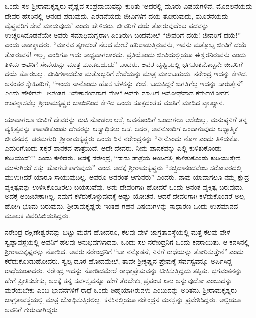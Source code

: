 ಒಂದು ಸಲ ಶ‍್ರೀರಾಮಕೃಷ್ಣರು ವೈಷ್ಣವ ಸಂಪ್ರದಾಯವನ್ನು ಕುರಿತು ‘ಅದರಲ್ಲಿ ಮೂರು ವಿಷಯಗಳಿವೆ; ಮೊದಲನೆಯದು ದೇವರ ಹೆಸರಿನಲ್ಲಿ ಆನಂದ ಪಡುವುದು, ಎರಡನೆಯದು ಜೀವಿಗಳಿಗೆ ದಯೆ ತೋರುವುದು, ಮೂರನೆಯದು ವೈಷ್ಣವರಿಗೆ ಸೇವೆ ಮಾಡುವುದು’ ಎಂದು ಹೇಳಿದರು. ಜೀವರಿಗೆ ದಯೆ ತೋರುವುದೆಂಬ ಪದವನ್ನು ಉಚ್ಚರಿಸಿದೊಡನೆಯೇ ಅವರು ಸಮಾಧಿಮಗ್ನರಾಗಿ ಹಿಂತಿರುಗಿ ಬಂದಮೇಲೆ “ಜೀವರಿಗೆ ದಯೆ! ಜೀವರಿಗೆ ದಯೆ!” ಎಂದು ಅವಾಕ್ಕಾದರು. “ಮಾನವ ತೃಣದಂತೆ ನೆಲದ ಮೇಲೆ ಹರಿದಾಡುತ್ತಿರುವನು, ಇವನು ಮತ್ತೊಬ್ಬ ಜೀವಿಗೆ ದಯೆ ತೋರುವನೆ! ಇಲ್ಲ, ಎಂದಿಗೂ ಇದು ಸಾಧ್ಯವಾಗಲಾರದು. ಪ್ರತಿಯೊಂದು ಜೀವಿಯಲ್ಲಿಯೂ ಈಶ್ವರನಿರುವನು ಎಂದು ತಿಳಿದು ಅವನಿಗೆ ಸೇವೆಯನ್ನು ಮಾತ್ರ ಮಾಡಬಹುದು” ಎಂದರು. ಅವರ ದೃಷ್ಟಿಯಲ್ಲಿ ಭಗವಂತನೊಬ್ಬನೇ ಜೀವರಿಗೆ ದಯೆ ತೋರಬಲ್ಲ. ಜೀವಿಗಳಾದರೋ ಮತ್ತೊಬ್ಬರಿಗೆ ಸೇವೆಯನ್ನು ಮಾತ್ರ ಮಾಡಬಹುದು. ನರೇಂದ್ರ ಇದನ್ನು ಕೇಳಿದ. ಅನಂತರ ಸ್ನೇಹಿತರಿಗೆ, “ಇಂದು ನಾನೊಂದು ಹೊಸ ಬೆಳಕನ್ನು ಕಂಡೆ. ಬದುಕಿದ್ದರೆ ಜಗತ್ತಿಗೆಲ್ಲ ಇದನ್ನು ಸಾರುತ್ತೇನೆ” ಎಂದು ಹೇಳಿದನು. ಅನಂತರ ವಿವೇಕಾನಂದರಾದ ಮೇಲೆ ಅವರು ಮಾಡಿದ ಅಮೋಘವಾದ ಕರ್ಮಯೋಗದ ಉಪನ್ಯಾಸವೆಲ್ಲ ಶ‍್ರೀರಾಮಕೃಷ್ಣರ ಬಾಯಿನಿಂದ ಕೇಳಿದ ಒಂದು ಸೂತ್ರದಂತಹ ಮಾತಿಗೆ ಮಾಡಿದ ವ್ಯಾಖ್ಯಾನ.

ಯಾವಾಗಲೂ ಜೀವಿಗೆ ದೇವರನ್ನು ರುಚಿ ನೋಡಲು ಆಸೆ, ಅವನೊಂದಿಗೆ ಒಂದಾಗಲು ಆಸೆಯಿಲ್ಲ. ಮನುಷ್ಯನಿಗೆ ತನ್ನ ವ್ಯಕ್ತಿತ್ವವನ್ನು ಕಾಪಾಡಿಕೊಂಡು ದೇವರನ್ನು ಆಸ್ವಾಧಿಸಲು ಆಸೆ. ಆದರೆ, ಅವನೊಂದಿಗೆ ಒಂದಾಗುವುದು ಆಧ್ಯಾತ್ಮಿಕ ಜೀವನದಲ್ಲಿ ಚರಮಗುರಿ. ಶ‍್ರೀರಾಮಕೃಷ್ಣರು ಒಂದು ದಿನ ನರೇಂದ್ರನನ್ನು “ನೀನೊಂದು ನೊಣ ಎಂದು ತಿಳಿದುಕೊ. ಎದುರಿಗೊಂದು ಸಕ್ಕರೆ ಪಾನಕದ ಪಾತ್ರೆಯಿದೆ. ಅದೇ ದೇವರು. ನೀನು ಪಾನಕವನ್ನು ಎಲ್ಲಿ ಕುಳಿತುಕೊಂಡು ಕುಡಿಯುವೆ?” ಎಂದು ಕೇಳಿದರು. ಅದಕ್ಕೆ ನರೇಂದ್ರ, “ನಾನು ಪಾತ್ರೆಯ ಅಂಚಿನಲ್ಲಿ ಕುಳಿತುಕೊಂಡು ಕುಡಿಯುತ್ತೇನೆ. ಮುಳುಗಿದರೆ ಸತ್ತು ಹೋಗಬೇಕಾಗುವುದು” ಎಂದ. ಅದಕ್ಕೆ ಶ‍್ರೀರಾಮಕೃಷ್ಣರು “ಸಚ್ಚಿದಾನಂದವೆಂಬ ಸರೋವರದಲ್ಲಿ ಮುಳುಗಿದರೆ ಯಾರೂ ಸಾಯುವುದಿಲ್ಲ. ಅವರೂ ಅದರಂತೆ ಆಗುವರು” ಎಂದರು. ನಾವು ಯಾವಾಗಲೂ ನಮ್ಮ ಕ್ಷುದ್ರ ವ್ಯಕ್ತಿತ್ವವನ್ನು ಉಳಿಸಿಕೊಂಡಿರಲು ಬಯಸುವೆವು. ಅದು ದೇವರಿಗಾಗಿ ಹೋದರೆ ಒಂದು ಅನಂತ ವ್ಯಕ್ತಿತ್ವ ಬರುವುದು. ಅದಕ್ಕೆ ಅಂಜಬೇಕಾಗಿಲ್ಲ. ನಮಗೆ ಕಳೆದುಕೊಳ್ಳುವುದಕ್ಕೆ ಅಷ್ಟು ಯೋಚನೆ. ಆದರೆ ದೇವರಿಗಾಗಿ ಕಳೆದುಕೊಂಡರೆ ಅಲ್ಪ ಹೋಗಿ ಭೂಮ ಬರುವುದು. ಶ‍್ರೀರಾಮಕೃಷ್ಣರು ಇಂತಹ ಗಹನ ವಿಷಯಗಳನ್ನು ಸಾಧಾರಣ ಒಂದು ಉಪಮಾನದ ಮೂಲಕ ವಿವರಿಸಿಬಿಡುತ್ತಿದ್ದರು.

ನರೇಂದ್ರ ದಕ್ಷಿಣೇಶ್ವರವನ್ನು ಬಿಟ್ಟು ಮನೆಗೆ ಹೋದರೂ, ಕೆಲವು ವೇಳೆ ಜಾಗ್ರತಾವಸ್ಥೆಯಲ್ಲಿ ಮತ್ತೆ ಕೆಲವು ವೇಳೆ ಸ್ವಪ್ನಾವಸ್ಥೆಯಲ್ಲಿ ಅವನಿಗೆ ಹಲವು ಅನುಭವಗಳಾದವು. ಒಂದು ಸಲ ನರೇಂದ್ರನಿಗೆ ಒಂದು ಕನಸಾಯಿತು. ಆ ಕನಸಿನಲ್ಲಿ ಶ‍್ರೀರಾಮಕೃಷ್ಣರನ್ನು ನೋಡಿದ. ಅವರು ನರೇಂದ್ರನಿಗೆ “ಬಾ ನನ್ನೊಡನೆ, ನಿನಗೆ ರಾಧೆಯನ್ನು ತೋರಿಸುತ್ತೇನೆ” ಎಂದು ಕರೆದುಕೊಂಡುಹೋದರು. ಸ್ವಲ್ಪ ದೂರ ಹೋದಮೇಲೆ, ತಾವೇ ಶ‍್ರೀಕೃಷ್ಣನ ಪ್ರೇಮಕ್ಕೆ ಸರ್ವಸ್ವವನ್ನೂ ಅರ್ಪಿಸಿದ್ದ ರಾಧೆಯಂತಾದರು. ನರೇಂದ್ರ ಇದನ್ನು ನೋಡಿದಮೇಲೆ ರಾಧಾಪ್ರೇಮವನ್ನು ಟೀಕಿಸುತ್ತಿದ್ದದು ತಪ್ಪಿತು. ಭಗವಂತನನ್ನು ಹೇಗೆ ಪ್ರೀತಿಸಬೇಕು, ಅದಕ್ಕೆ ತನ್ನ ಸರ್ವಸ್ವವನ್ನೂ ಹೇಗೆ ತೆರಬೇಕು, ಪ್ರಪಂಚ ಏನು ಅನ್ನುವುದೋ ಎಂಬುದನ್ನು ಮರೆಯಬೇಕು ಎಂಬ ಭಾವನೆಗಳಿಗೆ ರಾಧೆ ಒಂದು ಚಿಹ್ನೆಯಾಗಿರುವಳು ಎಂಬುದನ್ನು ಅರಿತನು. ಶ‍್ರೀರಾಮಕೃಷ್ಣರು ಜಾಗ್ರತಾವಸ್ಥೆಯಲ್ಲಿ ಮಾತ್ರ ಬೋಧಿಸುತ್ತಿರಲಿಲ್ಲ. ಕನಸಿನಲ್ಲಿಯೂ ನರೇಂದ್ರನ ಮನಸ್ಸನ್ನು ಪ್ರವೇಶಿಸಿದ್ದರು. ಅಲ್ಲಿಯೂ ಅವನಿಗೆ ಗುರುವಾಗಿದ್ದರು.

